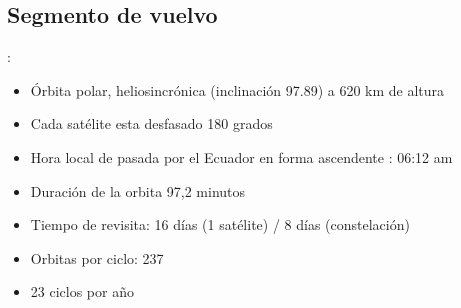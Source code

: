 \subsection{Segmento de vuelvo}
\begin{frame}{\secname : \subsecname}
\begin{itemize}
  \item Órbita polar, heliosincrónica (inclinación 97.89) a 620 km de altura
  \item Cada satélite esta desfasado 180 grados
  \item Hora local de pasada por el Ecuador en forma ascendente : 06:12 am
  \item Duración de la orbita 97,2 minutos
  \item Tiempo de revisita: 16 días (1 satélite) / 8 días (constelación)
  \item Orbitas por ciclo: 237
  \item 23 ciclos por año
\end{itemize}
\end{frame}
